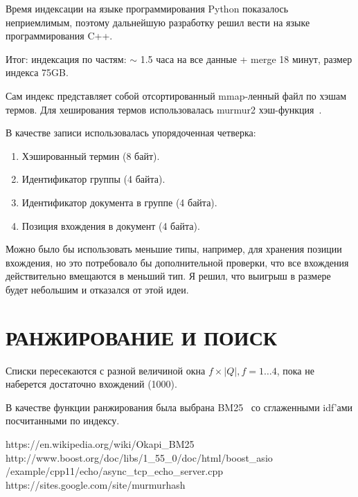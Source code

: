 \documentclass[14pt, a4paper]{extreport}
\begin{document}
Время индексации на языке программирования Python показалось неприемлимым, поэтому
дальнейшую разработку решил вести на языке программирования C++.

Итог: индексация по частям: $\sim$ 1.5 часа на все данные + merge 18 минут, размер индекса 75GB.

Сам индекс представляет собой отсортированный mmap-ленный файл по хэшам термов.
Для хеширования термов использовалась murmur2 хэш-функция~\cite{murmur2}.

В качестве записи использовалась упорядоченная четверка:
\begin{enumerate}
\item Хэшированный термин (8 байт).
\item Идентификатор группы (4 байта).
\item Идентификатор документа в группе (4 байта).
\item Позиция вхождения в документ (4 байта).
\end{enumerate}

Можно было бы использовать меньшие типы, например, для хранения позиции вхождения,
но это потребовало бы дополнительной проверки, что все вхождения действительно вмещаются в меньший тип.
Я решил, что выигрыш в размере будет небольшим и отказался от этой идеи.

\chapter{\MakeTextUppercase{Ранжирование и поиск}}
Списки пересекаются с разной величиной окна $f\times |Q|, f = 1\dots4$,
пока не наберется достаточно вхождений (1000).

В качестве функции ранжирования была выбрана BM25~\cite{wiki_bm25} со сглаженными
idf'ами посчитанными по индексу.

\newpage
\clearpage
%
\begin{thebibliography}{}
 https://en.wikipedia.org/wiki/Okapi\_BM25 
 http://www.boost.org/doc/libs/1\_55\_0/doc/html/boost\_asio\\
  /example/cpp11/echo/async\_tcp\_echo\_server.cpp 
 https://sites.google.com/site/murmurhash 
\end{thebibliography}
\end{document}
